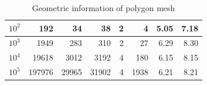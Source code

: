 \begin{table}
{\begin{tabular}{|r|r|r|r|r|r|r|r|}
$10^2$                                                                       & 192                                                                            & 34                                                                                   & 38                                                                                   & 2                                                                                              & 4                              & 5.05                                                                                  & 7.18                                                                              \\ \hline
$10^3$                                                                       & 1949                                                                           & 283                                                                                  & 310                                                                                  & 2                                                                                              & 27                             & 6.29                                                                                  & 8.30                                                                              \\ \hline
$10^4$                                                                       & 19618                                                                          & 3012                                                                                 & 3192                                                                                 & 4                                                                                              & 180                            & 6.15                                                                                  & 8.15                                                                              \\ \hline
$10^5$                                                                       & 197976                                                                         & 29965                                                                                & 31902                                                                                & 4                                                                                              & 1938                           & 6.21                                                                                  & 8.21                                                                              \\ \hline
\end{tabular}
}
\caption{Geometric information of polygon mesh }%
\label{table:results}
\end{table}


